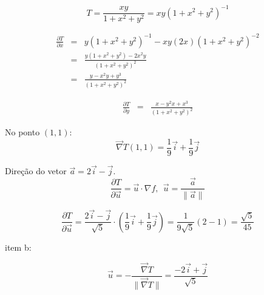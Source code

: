 \documentclass[a4paper,10pt]{article}
\begin{document}
$$T = \frac{xy}{1+x^2+y^2}=xy(1+x^2+y^2)^{-1}$$

\begin{eqnarray*}
 \frac{\partial T}{\partial x}&=&y(1+x^2+y^2)^{-1}-xy(2x)(1+x^2+y^2)^{-2}\\
 &=&\frac{y(1+x^2+y^2)-2x^2y}{(1+x^2+y^2)^{2}}\\
 &=&\frac{y-x^2y+y^3}{(1+x^2+y^2)^{2}}
\end{eqnarray*}


\begin{eqnarray*}
 \frac{\partial T}{\partial y}
 &=&\frac{x-y^2x+x^3}{(1+x^2+y^2)^{2}}
\end{eqnarray*}

No ponto $(1,1)$:
$$\vec{\nabla}T (1,1) = \frac{1}{9}\vec{i}+\frac{1}{9}\vec{j}$$

Direção do vetor $\vec{a}=2\vec{i}-\vec{j}$.
$$\frac{\partial T}{\partial \vec{u}}=\vec{u}\cdot\nabla f,~~\vec{u}=\frac{\vec{a}}{\|\vec{a}\|}$$

$$\frac{\partial T}{\partial \vec{u}}=\frac{2\vec{i}-\vec{j}}{\sqrt{5}}\cdot\left(\frac{1}{9}\vec{i}+\frac{1}{9}\vec{j}\right)=\frac{1}{9\sqrt{5}}(2-1)=\frac{\sqrt{5}}{45}$$

item b:

$$\vec{u}=-\frac{\vec{\nabla}T}{\|\vec{\nabla}T\|}=\frac{-2\vec{i}+\vec{j}}{\sqrt{5}}$$

 
\end{document}
